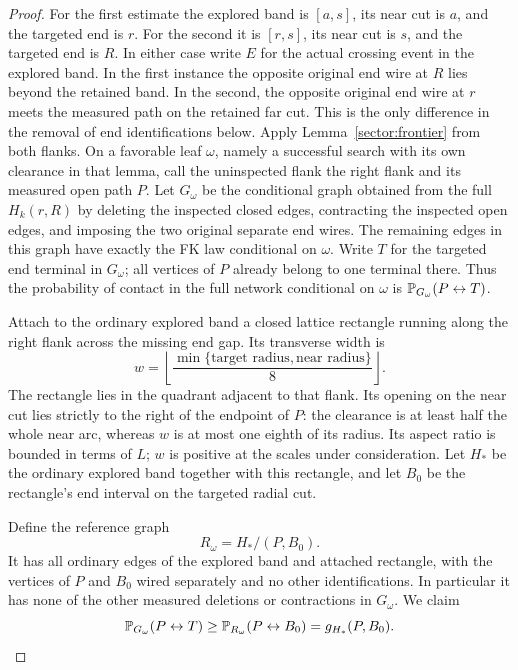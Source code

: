 \begin{proof}
For the first estimate the explored band is $[a,s]$, its near cut is
$a$, and the targeted end is $r$.  For the second it is $[r,s]$,
its near cut is $s$, and the targeted end is $R$.  In either case
write $E$ for the actual crossing event in the explored band.
In the first instance the opposite original end wire at $R$ lies
beyond the retained band.  In the second, the opposite original end
wire at $r$ meets the measured path on the retained far cut.  This is
the only difference in the removal of end identifications below.
Apply Lemma~\ref{sector:frontier} from both flanks.  On a favorable
leaf $\omega$, namely a successful search with its own clearance in that
lemma, call the uninspected flank the right flank and its measured
open path $P$.  Let $G_\omega$ be the conditional graph obtained from
the full $H_k(r,R)$ by deleting the inspected closed edges,
contracting the inspected open edges, and imposing the two original
separate end wires.  The remaining edges in this graph have exactly
the FK law conditional on $\omega$.  Write $T$ for the targeted end
terminal in $G_\omega$; all vertices of $P$ already belong to one
terminal there.  Thus the probability of contact in the full network
conditional on $\omega$ is $\mathbb P_{G_\omega}(P\leftrightarrow T)$.

Attach to the ordinary explored band a closed lattice rectangle running
along the right flank across the missing end gap.  Its transverse width is
\begin{equation}
\label{sector:extension-width}
 w=\left\lfloor
       \frac{\min\{\text{target radius},\text{near radius}\}}8
       \right\rfloor.
\end{equation}
The rectangle lies in the quadrant adjacent to that flank.  Its
opening on the near cut lies strictly to the right of the endpoint
of $P$: the clearance is at least half the whole near arc, whereas
$w$ is at most one eighth of its radius.  Its aspect ratio is
bounded in terms of $L$; $w$ is positive at the scales under
consideration.  Let $H_*$ be the ordinary explored band together with
this rectangle, and let $B_0$ be the rectangle's end interval on the
targeted radial cut.

Define the reference graph
\[
 R_\omega=H_* /(P,B_0).
\]
It has all ordinary edges of the explored band and attached rectangle,
with the vertices of $P$ and $B_0$ wired separately and no other
identifications.  In particular it has none of the other measured
deletions or contractions in $G_\omega$.  We claim
\begin{equation}
\label{sector:conditional-extension}
 \mathbb P_{G_\omega}(P\leftrightarrow T)
 \ge \mathbb P_{R_\omega}(P\leftrightarrow B_0)
 =g_{H_*}(P,B_0).
\end{equation}


\end{proof}
